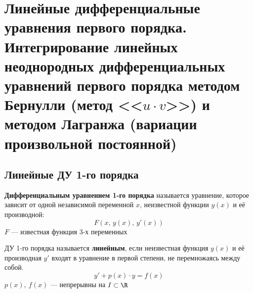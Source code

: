 \newpage
\section{Линейные дифференциальные уравнения первого порядка. Интегрирование линейных неоднородных дифференциальных уравнений первого порядка методом Бернулли (метод <<$u \cdot v$>>) и методом Лагранжа (вариации произвольной постоянной)}

\subsection*{Линейные ДУ 1-го порядка}
\begin{definition}
    \textbf{Дифференциальным уравнением 1-го порядка} называется уравнение, которое зависит от одной независимой переменной $x$, неизвестной функции $y(x)$ и её производной:
    \[
        F\left(x,\, y(x),\, y'(x)\right)
    \]
    $F$ --- известная функция 3-х переменных
\end{definition}

\begin{definition}
    ДУ 1-го порядка называется \textbf{линейным}, если неизвестная функция $y(x)$ и её производная $y'$ входят в уравнение в первой степени, не перемножаясь между собой.
    \[
        \boxed{y' + p(x)\cdot y = f(x)}
    \]
    $p(x),\ f(x)$ --- непрерывны на $I \subset \R$
\end{definition}

